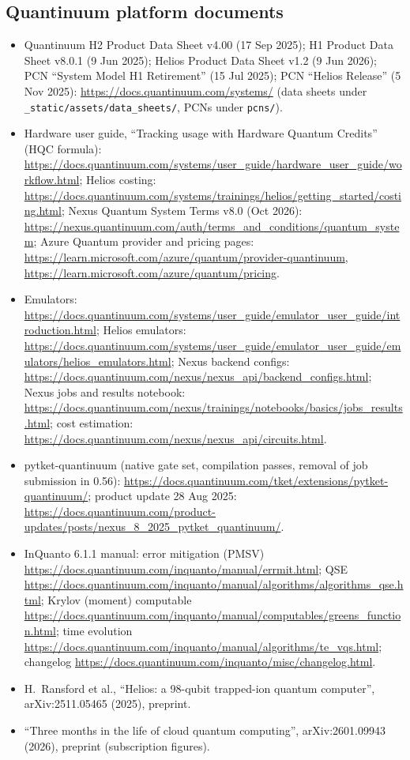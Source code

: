 \documentclass[11pt,a4paper]{article}
\begin{document}
\subsection*{Quantinuum platform documents}
\begin{itemize}\small\sloppy
\item Quantinuum H2 Product Data Sheet v4.00 (17 Sep 2025); H1 Product Data Sheet v8.0.1 (9 Jun 2025); Helios Product Data Sheet v1.2 (9 Jun 2026); PCN ``System Model H1 Retirement'' (15 Jul 2025); PCN ``Helios Release'' (5 Nov 2025): \url{https://docs.quantinuum.com/systems/} (data sheets under \texttt{\_static/assets/data\_sheets/}, PCNs under \texttt{pcns/}).
\item Hardware user guide, ``Tracking usage with Hardware Quantum Credits'' (HQC formula): \url{https://docs.quantinuum.com/systems/user_guide/hardware_user_guide/workflow.html}; Helios costing: \url{https://docs.quantinuum.com/systems/trainings/helios/getting_started/costing.html}; Nexus Quantum System Terms v8.0 (Oct 2026): \url{https://nexus.quantinuum.com/auth/terms_and_conditions/quantum_system}; Azure Quantum provider and pricing pages: \url{https://learn.microsoft.com/azure/quantum/provider-quantinuum}, \url{https://learn.microsoft.com/azure/quantum/pricing}.
\item Emulators: \url{https://docs.quantinuum.com/systems/user_guide/emulator_user_guide/introduction.html}; Helios emulators: \url{https://docs.quantinuum.com/systems/user_guide/emulator_user_guide/emulators/helios_emulators.html}; Nexus backend configs: \url{https://docs.quantinuum.com/nexus/nexus_api/backend_configs.html}; Nexus jobs and results notebook: \url{https://docs.quantinuum.com/nexus/trainings/notebooks/basics/jobs_results.html}; cost estimation: \url{https://docs.quantinuum.com/nexus/nexus_api/circuits.html}.
\item pytket-quantinuum (native gate set, compilation passes, removal of job submission in 0.56): \url{https://docs.quantinuum.com/tket/extensions/pytket-quantinuum/}; product update 28 Aug 2025: \url{https://docs.quantinuum.com/product-updates/posts/nexus_8_2025_pytket_quantinuum/}.
\item InQuanto 6.1.1 manual: error mitigation (PMSV) \url{https://docs.quantinuum.com/inquanto/manual/errmit.html}; QSE \url{https://docs.quantinuum.com/inquanto/manual/algorithms/algorithms_qse.html}; Krylov (moment) computable \url{https://docs.quantinuum.com/inquanto/manual/computables/greens_function.html}; time evolution \url{https://docs.quantinuum.com/inquanto/manual/algorithms/te_vqs.html}; changelog \url{https://docs.quantinuum.com/inquanto/misc/changelog.html}.
\item H.~Ransford et al., ``Helios: a 98-qubit trapped-ion quantum computer'', arXiv:2511.05465 (2025), preprint.
\item ``Three months in the life of cloud quantum computing'', arXiv:2601.09943 (2026), preprint (subscription figures).
\end{itemize}
\end{document}

